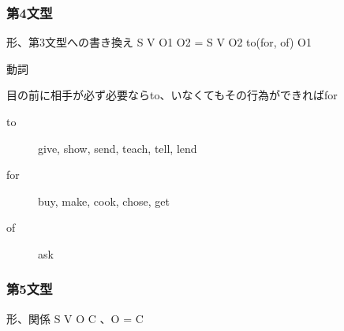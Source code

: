 \documentclass[10pt]{jsarticle}
\newcommand{\answer}[2]{{\color{orange}#2}}
\newcommand{\question}[2]{{\color{orange}#2}}
\newcommand{\answer}[2]{\vspace{#1mm}}
\newcommand{\question}[2]{#1}
\begin{document}
\vspace{-5mm}
\subsubsection*{第4文型}
\begin{itembox}[l]{形、第3文型への書き換え}
	\answer{6}{
		S V O1 O2 = S V O2 to(for, of) O1
	}
\end{itembox}
\begin{itembox}[l]{動詞}
	\question{

		\begin{multicols}{3}
			\begin{itemize}
				\item give \answer{5}{}
				\item buy \answer{5}{}
				\item make \answer{5}{}
				\item show \answer{5}{}
				\item teach \answer{5}{}
				\item send \answer{5}{}
				\item cook \answer{5}{}
				\item tell \answer{5}{}
				\item ask \answer{5}{}
			\end{itemize}
		\end{multicols}
		*書き換える時の前置詞3、どれがどれか
		\vspace{3mm}
	}{
		目の前に相手が必ず必要ならto、いなくてもその行為ができればfor
		\begin{description}
			\item[to] give, show, send, teach, tell, lend
			\item[for] buy, make, cook, chose, get
			\item[of] ask
		\end{description}

	}
\end{itembox}

\vspace{-5mm}
\subsubsection*{第5文型}
\begin{itembox}[l]{形、関係}
	\answer{6}{S V O C 、O = C}
\end{itembox}
\end{document}

